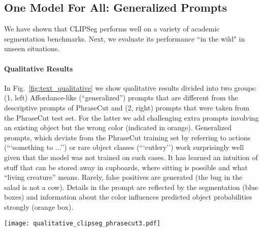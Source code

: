 \documentclass[10pt,twocolumn,letterpaper]{article}
\begin{document}
\subsection{One Model For All: Generalized Prompts}

\label{sec:generalize}

We have shown that CLIPSeg performs well on a variety of academic segmentation benchmarks. Next, we evaluate its performance ``in the wild" in unseen situations.

\paragraph{Qualitative Results}

In Fig.~\ref{fig:text_qualitative} we show qualitative results divided into two groups: (1, left) Affordance-like \cite{gibson66, gibson79} (``generalized'')  prompts that are different from the descriptive prompts of PhraseCut and (2, right) prompts that were taken from the PhraseCut test set. For the latter we add challenging extra prompts involving an existing object but the wrong color (indicated in orange). 
Generalized prompts, which deviate from the PhraseCut training set by referring to actions (```something to ...'') or rare object classes (```cutlery'') work surprisingly well given that the model was not trained on such cases. It has learned an intuition of stuff that can be stored away in cupboards, where sitting is possible and what ``living creature'' means. Rarely, false positives are generated (the bug in the salad is not a cow).
Details in the prompt are reflected by the segmentation (blue boxes) and information about the color influences predicted object probabilities strongly (orange box).


\begin{figure*}[tb]
    \centering
    \texttt{[image: qualitative\_clipseg\_phrasecut3.pdf]}
    \caption{Qualitative predictions of CLIPSeg (PC+) for various prompts, darkness indicates prediction strength. The generalized prompts (left) deviate from the PhraseCut prompts as they involve action-related properties or new object names.}
    \label{fig:text_qualitative}
\end{figure*}
\end{document}
